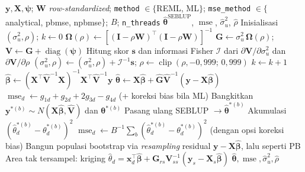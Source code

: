 \documentclass[11pt,a4paper]{article}
\theoremstyle{definition}
\begin{document}
\begin{algorithm}[H]
\caption{\texttt{eblup\_sfh}: SEBLUP spasial via \emph{Fisher-scoring} dua parameter}
\label{alg:sfh}
\begin{algorithmic}[1]
\Require $\mathbf{y}, \mathbf{X}, \boldsymbol{\psi}$; $\mathbf{W}$ \emph{row-standardized};
  \texttt{method} $\in\{$REML, ML$\}$;
  \texttt{mse\_method} $\in\{$analytical, pbmse, npbmse$\}$; $B$; \texttt{n\_threads}
\Ensure $\hat{\boldsymbol{\theta}}^{\text{SEBLUP}}$, $\operatorname{mse}$,
  $\hat{\sigma}_u^2$, $\hat{\rho}$
\State Inisialisasi $(\sigma_u^2, \rho)$; $k \gets 0$
  \State $\boldsymbol{\Omega}(\rho) \gets
    [(\mathbf{I} - \rho\mathbf{W})^{\top}(\mathbf{I} - \rho\mathbf{W})]^{-1}$
  \State $\mathbf{G} \gets \sigma_u^2\,\boldsymbol{\Omega}(\rho)$;
    $\mathbf{V} \gets \mathbf{G} + \operatorname{diag}(\boldsymbol{\psi})$
  \State Hitung skor $\mathbf{s}$ dan informasi Fisher $\boldsymbol{\mathcal{I}}$
    dari $\partial\mathbf{V}/\partial\sigma_u^2$ dan $\partial\mathbf{V}/\partial\rho$
  \State $(\sigma_u^2, \rho) \gets (\sigma_u^2, \rho) + \boldsymbol{\mathcal{I}}^{-1}\mathbf{s}$;
    $\rho \gets \operatorname{clip}(\rho, -0{,}999;\, 0{,}999)$
  \State $k \gets k + 1$
\EndWhile
\State $\hat{\boldsymbol{\beta}} \gets
  (\mathbf{X}^{\top}\hat{\mathbf{V}}^{-1}\mathbf{X})^{-1}
  \mathbf{X}^{\top}\hat{\mathbf{V}}^{-1}\mathbf{y}$
\State $\hat{\boldsymbol{\theta}} \gets \mathbf{X}\hat{\boldsymbol{\beta}}
  + \hat{\mathbf{G}}\hat{\mathbf{V}}^{-1}(\mathbf{y} - \mathbf{X}\hat{\boldsymbol{\beta}})$
  \State $\operatorname{mse}_d \gets g_{1d} + g_{2d} + 2g_{3d} - g_{4d}$
    (+ koreksi bias bila ML)
   
    \State Bangkitkan $\mathbf{y}^{*(b)} \sim N(\mathbf{X}\hat{\boldsymbol{\beta}}, \hat{\mathbf{V}})$
      dan $\boldsymbol{\theta}^{*(b)}$
    \State Pasang ulang SEBLUP $\to \hat{\boldsymbol{\theta}}^{*(b)}$
    \State Akumulasi $(\hat{\theta}_d^{*(b)} - \theta_d^{*(b)})^2$
  \EndFor
  \State $\operatorname{mse}_d \gets B^{-1}\sum_b (\hat{\theta}_d^{*(b)} - \theta_d^{*(b)})^2$
    (dengan opsi koreksi bias)
\Else {}
  \State Bangun populasi bootstrap via \emph{resampling} residual
    $\mathbf{y} - \mathbf{X}\hat{\boldsymbol{\beta}}$, lalu seperti PB
\EndIf
\State Area tak tersampel: kriging
  $\hat{\theta}_d = \mathbf{x}_d^{\top}\hat{\boldsymbol{\beta}}
  + \mathbf{G}_{rs}\mathbf{V}_{ss}^{-1}(\mathbf{y}_s - \mathbf{X}_s\hat{\boldsymbol{\beta}})$
\State \Return $\hat{\boldsymbol{\theta}}, \operatorname{mse},
  \hat{\sigma}_u^2, \hat{\rho}$
\end{algorithmic}
\end{algorithm}
\end{document}
